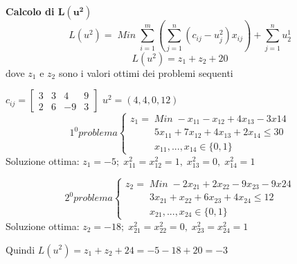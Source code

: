 \textbf{Calcolo di $\boldsymbol{L(u^{2})}$}
\begin{equation}
L(u^{2})=\;Min\;\displaystyle\sum_{i=1}^{m}(\sum_{j=1}^{n}(c_{ij}-u_{j}^{2})x_{ij})+\sum_{j=1}^{n}u_{2}^{1}
\end{equation}
\begin{equation}
	L(u^{2})=z_{1}+z_{2}+20
\end{equation}
dove $z_{1}$ e $z_{2}$ sono i valori ottimi dei problemi sequenti

$c_{ij}=\begin{bmatrix}3 & 3 & 4 & 9 \\ 2 & 6 & -9 & 3\end{bmatrix}$\newline
$u^{2}=(4,4,0,12)$
\begin{displaymath}
1^{0} problema
\begin{cases}
z_{1}=\;Min\;-x_{11}-x_{12}+4x_{13}-3x{14}\\
\;\;\;\;\;\;\;\;\;5x_{11}+7x_{12}+4x_{13}+2x_{14}\le 30\\
\;\;\;\;\;\;\;\;\;x_{11},...,x_{14}\in\{0,1\}
\end{cases}
\end{displaymath}
Soluzione ottima: $z_{1}=-5;\;x_{11}^{2}=x_{12}^{2}=1,\;x_{13}^{2}=0,\;x_{14}^{2}=1$

\begin{displaymath}
2^{0} problema
\begin{cases}
z_{2}=\;Min\;-2x_{21}+2x_{22}-9x_{23}-9x{24}\\
\;\;\;\;\;\;\;\;\;3x_{21}+x_{22}+6x_{23}+4x_{24}\le 12\\
\;\;\;\;\;\;\;\;\;x_{21},...,x_{24}\in\{0,1\}
\end{cases}
\end{displaymath}
Soluzione ottima: $z_{2}=-18;\;x_{21}^{2}=x_{22}^{2}=0,\;x_{23}^{2}=x_{24}^{2}=1$

Quindi $L(u^{2})=z_{1}+z_{2}+24=-5-18+20=-3$

